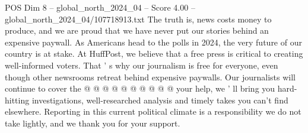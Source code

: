 \begin{textsample}{POS Dim 8 – global\_north\_2024\_04 – Score 4.00 – global\_north\_2024\_04/107718913.txt}
The truth is, news costs money to produce, and we are proud that we have never put our stories behind an expensive paywall.
As Americans head to the polls in 2024, the very future of our country is at stake.
At HuffPost, we believe that a free press is critical to creating well-informed voters.
That ' s why our journalism is free for everyone, even though other newsrooms retreat behind expensive paywalls.
Our journalists will continue to cover the @ @ @ @ @ @ @ @ @ @ your help, we ' ll bring you hard-hitting investigations, well-researched analysis and timely takes you can't find elsewhere.
Reporting in this current political climate is a responsibility we do not take lightly, and we thank you for your support.

\end{textsample}
